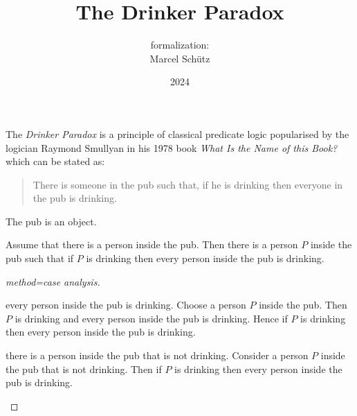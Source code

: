 \documentclass{article}
\title{The Drinker Paradox}
\author{\Naproche formalization:\\[0.5em]Marcel Schütz}
\date{2024}
\begin{document}
  \maketitle


  \noindent The \emph{Drinker Paradox} is a principle of classical predicate 
  logic popularised by the logician Raymond Smullyan in his 1978 book
  \textit{What Is the Name of this Book?} \cite{Smullyan1978} which can be 
  stated as:

  \begin{quotation}
    \noindent There is someone in the pub such that, if he is drinking then 
    everyone in the pub is drinking.
  \end{quotation}

  \begin{forthel}
    \begin{signature*}
      The pub is an object.
    \end{signature*}
    
    \begin{theorem*}[title=Drinker Paradox,id=drinker_paradox]
      Assume that there is a person inside the pub.
      Then there is a person $P$ inside the pub such that if $P$ is drinking then every person inside the pub is drinking.
    \end{theorem*}
    \begin{proof}[method=case analysis]
      \begin{case}{every person inside the pub is drinking.}
        Choose a person $P$ inside the pub.
        Then $P$ is drinking and every person inside the pub is drinking.
        Hence if $P$ is drinking then every person inside the pub is drinking.
      \end{case}
    
      \begin{case}{there is a person inside the pub that is not drinking.}
        Consider a person $P$ inside the pub that is not drinking.
        Then if $P$ is drinking then every person inside the pub is drinking.
      \end{case}
    \end{proof}
  \end{forthel}

  \printbibliography
\end{document}

